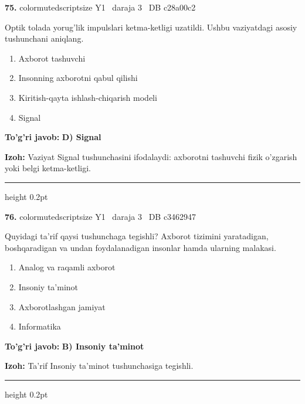 \documentclass[10pt,a4paper,oneside]{article}
\begin{document}
\noindent\textbf{\color{ink}75.}  {color{muted}scriptsize Y1 \textbullet\ daraja 3 \textbullet\ DB c28a00c2}
\par
Optik tolada yorug'lik impulslari ketma-ketligi uzatildi. Ushbu vaziyatdagi asosiy tushunchani aniqlang.
\begin{enumerate}[label=\Alph*),leftmargin=9mm]
\item Axborot tashuvchi
\item Insonning axborotni qabul qilishi
\item Kiritish-qayta ishlash-chiqarish modeli
\item Signal
\end{enumerate}
\begin{tcolorbox}[enhanced,breakable,colback=teal!4,colframe=teal!50!black,boxrule=0.5pt,arc=1.1mm,left=3mm,right=3mm,top=1.7mm,bottom=1.7mm,before skip=2mm,after skip=2mm]
\textbf{\color{teal}To'g'ri javob:} \textbf{D) Signal}
\par\smallskip
\textbf{Izoh:} Vaziyat Signal tushunchasini ifodalaydi: axborotni tashuvchi fizik o'zgarish yoki belgi ketma-ketligi.
\end{tcolorbox}
\vspace{2mm}\hrule height 0.2pt \vspace{3mm}

\noindent\textbf{\color{ink}76.}  {color{muted}scriptsize Y1 \textbullet\ daraja 3 \textbullet\ DB c3462947}
\par
Quyidagi ta'rif qaysi tushunchaga tegishli? Axborot tizimini yaratadigan, boshqaradigan va undan foydalanadigan insonlar hamda ularning malakasi.
\begin{enumerate}[label=\Alph*),leftmargin=9mm]
\item Analog va raqamli axborot
\item Insoniy ta'minot
\item Axborotlashgan jamiyat
\item Informatika
\end{enumerate}
\begin{tcolorbox}[enhanced,breakable,colback=teal!4,colframe=teal!50!black,boxrule=0.5pt,arc=1.1mm,left=3mm,right=3mm,top=1.7mm,bottom=1.7mm,before skip=2mm,after skip=2mm]
\textbf{\color{teal}To'g'ri javob:} \textbf{B) Insoniy ta'minot}
\par\smallskip
\textbf{Izoh:} Ta'rif Insoniy ta'minot tushunchasiga tegishli.
\end{tcolorbox}
\vspace{2mm}\hrule height 0.2pt \vspace{3mm}
\end{document}
